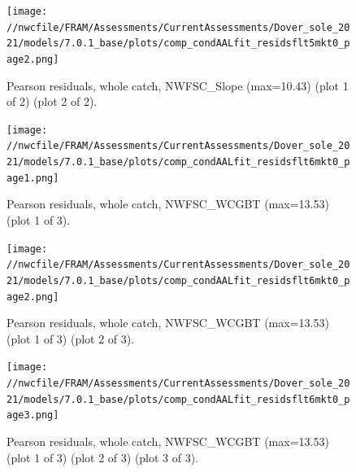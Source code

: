 \documentclass[11pt,
  english,
  a4paper,
]{article}
\begin{document}
\tagmcend\tagstructend


\begin{figure}
\centering
\texttt{[image: //nwcfile/FRAM/Assessments/CurrentAssessments/Dover\_sole\_2021/models/7.0.1\_base/plots/comp\_condAALfit\_residsflt5mkt0\_page2.png]}
\caption{Pearson residuals, whole catch, NWFSC\_Slope (max=10.43) (plot 1 of 2) (plot 2 of 2).\label{fig:comp_condAALfit_residsflt5mkt0_page2}}
\end{figure}

\tagmcend\tagstructend


\begin{figure}
\centering
\texttt{[image: //nwcfile/FRAM/Assessments/CurrentAssessments/Dover\_sole\_2021/models/7.0.1\_base/plots/comp\_condAALfit\_residsflt6mkt0\_page1.png]}
\caption{Pearson residuals, whole catch, NWFSC\_WCGBT (max=13.53) (plot 1 of 3).\label{fig:comp_condAALfit_residsflt6mkt0_page1}}
\end{figure}

\tagmcend\tagstructend


\begin{figure}
\centering
\texttt{[image: //nwcfile/FRAM/Assessments/CurrentAssessments/Dover\_sole\_2021/models/7.0.1\_base/plots/comp\_condAALfit\_residsflt6mkt0\_page2.png]}
\caption{Pearson residuals, whole catch, NWFSC\_WCGBT (max=13.53) (plot 1 of 3) (plot 2 of 3).\label{fig:comp_condAALfit_residsflt6mkt0_page2}}
\end{figure}

\tagmcend\tagstructend


\begin{figure}
\centering
\texttt{[image: //nwcfile/FRAM/Assessments/CurrentAssessments/Dover\_sole\_2021/models/7.0.1\_base/plots/comp\_condAALfit\_residsflt6mkt0\_page3.png]}
\caption{Pearson residuals, whole catch, NWFSC\_WCGBT (max=13.53) (plot 1 of 3) (plot 2 of 3) (plot 3 of 3).\label{fig:comp_condAALfit_residsflt6mkt0_page3}}
\end{figure}
\end{document}
